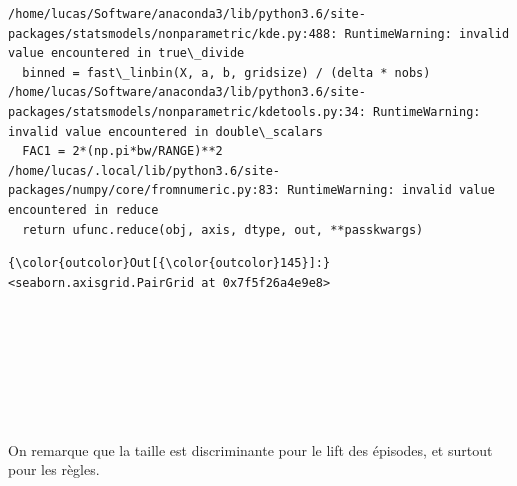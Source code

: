 \documentclass[11pt]{article}
\begin{document}
    \begin{Verbatim}[commandchars=\\\{\}]
/home/lucas/Software/anaconda3/lib/python3.6/site-packages/statsmodels/nonparametric/kde.py:488: RuntimeWarning: invalid value encountered in true\_divide
  binned = fast\_linbin(X, a, b, gridsize) / (delta * nobs)
/home/lucas/Software/anaconda3/lib/python3.6/site-packages/statsmodels/nonparametric/kdetools.py:34: RuntimeWarning: invalid value encountered in double\_scalars
  FAC1 = 2*(np.pi*bw/RANGE)**2
/home/lucas/.local/lib/python3.6/site-packages/numpy/core/fromnumeric.py:83: RuntimeWarning: invalid value encountered in reduce
  return ufunc.reduce(obj, axis, dtype, out, **passkwargs)

    \end{Verbatim}

\begin{Verbatim}[commandchars=\\\{\}]
{\color{outcolor}Out[{\color{outcolor}145}]:} <seaborn.axisgrid.PairGrid at 0x7f5f26a4e9e8>
\end{Verbatim}
            
    \begin{center}
    \end{center}
    { \hspace*{\fill} \\}
    
    \begin{center}
    \end{center}
    { \hspace*{\fill} \\}
    
    \begin{center}
    \end{center}
    { \hspace*{\fill} \\}
    
    \begin{center}
    \end{center}
    { \hspace*{\fill} \\}
    
    On remarque que la taille est discriminante pour le lift des épisodes,
et surtout pour les règles.
\end{document}
